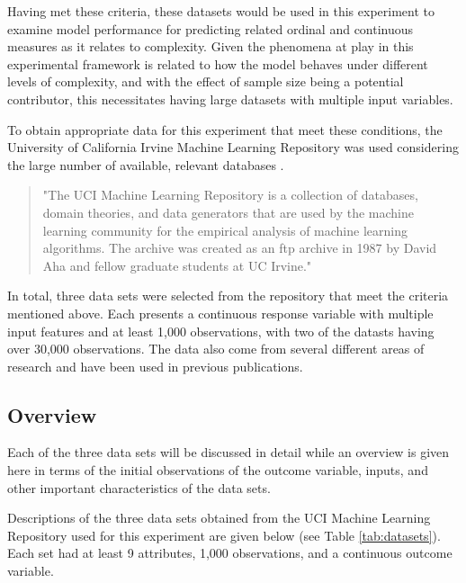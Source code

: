 \documentclass[10pt]{article}\usepackage[]{graphicx}\usepackage[]{xcolor}
\begin{document}
Having met these criteria, these datasets would be used in this experiment to examine model performance for predicting related ordinal and continuous measures as it relates to complexity. Given the phenomena at play in this experimental framework is related to how the model behaves under different levels of complexity, and with the effect of sample size being a potential contributor, this necessitates having large datasets with multiple input variables.

To obtain appropriate data for this experiment that meet these conditions, the University of California Irvine Machine Learning Repository was used considering the large number of available, relevant databases \cite{Dua:2019}.

\begin{quote}
"The UCI Machine Learning Repository is a collection of databases, domain theories, and data generators that are used by the machine learning community for the empirical analysis of machine learning algorithms. The archive was created as an ftp archive in 1987 by David Aha and fellow graduate students at UC Irvine." \cite{UCI:Desc}
\end{quote}

In total, three data sets were selected from the repository that meet the criteria mentioned above. Each presents a continuous response variable with multiple input features and at least 1,000 observations, with two of the datasts having over 30,000 observations. The data also come from several different areas of research and have been used in previous publications.

\subsection{Overview}
Each of the three data sets will be discussed in detail while an overview is given here in terms of the initial observations of the outcome variable, inputs, and other important characteristics of the data sets.

Descriptions of the three data sets obtained from the UCI Machine Learning Repository used for this experiment are given below (see Table \ref{tab:datasets}). Each set had at least 9 attributes, 1,000 observations, and a continuous outcome variable. \\
\end{document}
